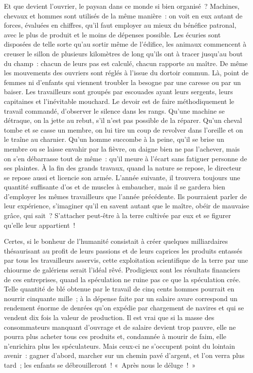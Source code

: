 \documentclass[french,twoside]{book} %
\begin{document}
Et que devient l’ouvrier, le paysan dans ce monde si bien organisé ? Machines, chevaux et hommes sont utilisés de la même manière : on voit en eux autant de forces, évaluées en chiffres, qu’il faut employer au mieux du bénéfice patronal, avec le plus de produit et le moins de dépenses possible. Les écuries sont disposées de telle sorte qu’au sortir même de l’édifice, les animaux commencent à creuser le sillon de plusieurs kilomètres de long qu’ils ont à tracer jusqu’au bout du champ : chacun de leurs pas est calculé, chacun rapporte au maître. De même les mouvements des ouvriers sont réglés à l’issue du dortoir commun. Là, point de femmes ni d’enfants qui viennent troubler la besogne par une caresse ou par un baiser. Les travailleurs sont groupés par escouades ayant leurs sergents, leurs capitaines et l’inévitable mouchard. Le devoir est de faire méthodiquement le travail commandé, d’observer le silence dans les rangs. Qu’une machine se détraque, on la jette au rebut, s’il n’est pas possible de la réparer. Qu’un cheval tombe et se casse un membre, on lui tire un coup de revolver dans l’oreille et on le traîne au charnier. Qu’un homme succombe à la peine, qu’il se brise un membre ou se laisse envahir par la fièvre, on daigne bien  ne pas l’achever, mais on s’en débarrasse tout de même : qu’il meure à l’écart sans fatiguer personne de ses plaintes. À la fin des grands travaux, quand la nature se repose, le directeur se repose aussi et licencie son armée. L’année suivante, il trouvera toujours une quantité suffisante d’os et de muscles à embaucher, mais il se gardera bien d’employer les mêmes travailleurs que l’année précédente. Ils pourraient parler de leur expérience, s’imaginer qu’il en savent autant que le maître, obéir de mauvaise grâce, qui sait ? S’attacher peut-être à la terre cultivée par eux et se figurer qu’elle leur appartient !\par
Certes, si le bonheur de l’humanité consistait à créer quelques milliardaires thésaurisant au profit de leurs passions et de leurs caprices les produits entassés par tous les travailleurs asservis, cette exploitation scientifique de la terre par une chiourme de galériens serait l’idéal rêvé. Prodigieux sont les résultats financiers de ces entreprises, quand la spéculation ne ruine pas ce que la spéculation crée. Telle quantité de blé obtenue par le travail de cinq cents hommes pourrait en nourrir cinquante mille ; à la dépense faite par un salaire avare correspond un rendement énorme de denrées qu’on expédie par chargement de navires et qui se vendent dix fois la valeur de production.  Il est vrai que si la masse des consommateurs manquant d’ouvrage et de salaire devient trop pauvre, elle ne pourra plus acheter tous ces produits et, condamnée à mourir de faim, elle n’enrichira plus les spéculateurs. Mais ceux-ci ne s’occupent point du lointain avenir : gagner d’abord, marcher sur un chemin pavé d’argent, et l’on verra plus tard ; les enfants se débrouilleront ! « Après nous le déluge ! »\par
\end{document}
